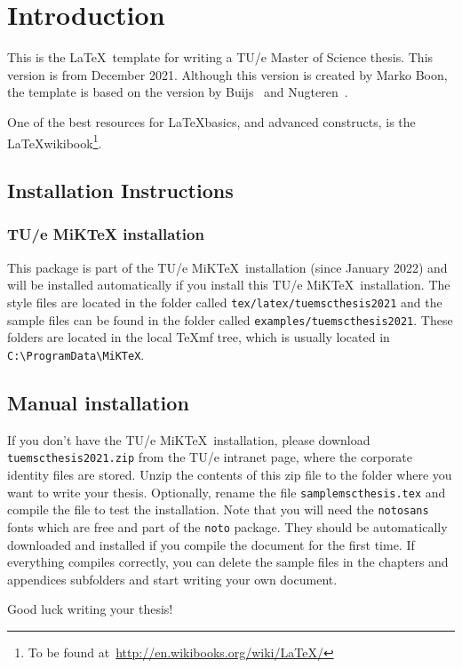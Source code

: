 \chapter{Introduction}\label{chapter:introduction}

This is the \LaTeX\ template for writing a TU/e Master of Science thesis. This version is from December 2021. Although this version is created by Marko Boon, the template is based on the version by Buijs~\cite{MScBuijs2010} and Nugteren~\cite{MScNugteren2010}.

One of the best resources for \LaTeX basics, and advanced constructs, is the \LaTeX wikibook\footnote{To be found at~\url{http://en.wikibooks.org/wiki/LaTeX/}}. 

\section{Installation Instructions}

\subsection{TU/e MiKTeX installation}

This package is part of the TU/e MiK\TeX\ installation (since January 2022) and will be installed automatically if you install this TU/e MiK\TeX\ installation. The style files are located in the folder called \verb|tex/latex/tuemscthesis2021| and the sample files can be found in the folder called \verb|examples/tuemscthesis2021|. These folders are located in the local \TeX mf tree, which is usually located in \verb|C:\ProgramData\MiKTeX|.

\section{Manual installation}

If you don't have the TU/e MiK\TeX\ installation, please download \verb|tuemscthesis2021.zip| from the TU/e intranet page, where the corporate identity files are stored. Unzip the contents of this zip file to the folder where you want to write your thesis. Optionally, rename the file \verb|samplemscthesis.tex| and compile the file to test the installation. Note that you will need the \verb|notosans| fonts which are free and part of the \verb|noto| package. They should be automatically downloaded and installed if you compile the document for the first time. If everything compiles correctly, you can delete the sample files in the chapters and appendices subfolders and start writing your own document.


\bigskip\noindent
Good luck writing your thesis!


